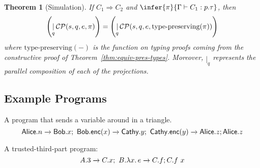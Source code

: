 \documentclass{article}
\newtheorem{thm}{Theorem}
\theoremstyle{definition}
\newcommand{\To}{\Rightarrow}
\newcommand{\own}[2]{#1.#2}
\newcommand{\send}[3][]{#2\nolinebreak \mathrel{\xrightarrow{#1}}\nolinebreak #3}
\newcommand{\proves}{\vdash}
\begin{document}
\begin{thm}[Simulation]
  \label{thm:simulation}
  If $C_1 \To C_2$ and $\infer{\pi}{\Gamma \proves C_1 : p.\tau}$, then $$\left(\mathop{|}_{q}\mathcal{C}\mathcal{P}(s, q, e, \pi)\right) = \left(\mathop{|}_{q}\mathcal{C}\mathcal{P}(s, q, e, \text{type-preserving}(\pi))\right)$$
  where $\text{type-preserving}(-)$ is the function on typing proofs coming from the constructive proof of Theorem~\ref{thm:equiv-pres-types}.
  Moreover, $\mathop{|}_{q}$ represents the parallel composition of each of the projections.
\end{thm}

\subsection{Example Programs}
A program that sends a variable around in a triangle.
$$\send{\own{\textsf{Alice}}{n}}{\own{\textsf{Bob}}{x}};~\send{\own{\textsf{Bob}}{\textsf{enc}(x)}}{\own{\textsf{Cathy}}{y}};~\send{\own{\textsf{Cathy}}{\textsf{enc}(y)}}{\own{\textsf{Alice}}{z}}; \own{\textsf{Alice}}{z}$$

A trusted-third-part program:
$$\send{\own{A}{3}}{\own{C}{x}};~\send{\own{B}{\lambda x.\,e}}{\own{C}{f}}; \own{C}{f~x}$$


\end{document}
